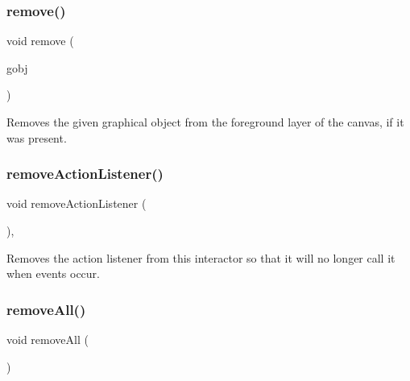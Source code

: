 \subsubsection{\texorpdfstring{remove()}{remove()}\hspace{0.1cm}{\footnotesize\ttfamily [2/2]}}
{\footnotesize\ttfamily void remove (\begin{DoxyParamCaption}\item[{\mbox{\hyperlink{classsgl_1_1GObject}{G\+Object}} \&}]{gobj }\end{DoxyParamCaption})\hspace{0.3cm}{\ttfamily [virtual]}}



Removes the given graphical object from the foreground layer of the canvas, if it was present. 

\mbox{\label{classsgl_1_1GInteractor_ab7fe7a876367b87cf7202f947f1d05e4}} 
\subsubsection{\texorpdfstring{remove\+Action\+Listener()}{removeActionListener()}}
{\footnotesize\ttfamily void remove\+Action\+Listener (\begin{DoxyParamCaption}{ }\end{DoxyParamCaption})\hspace{0.3cm}{\ttfamily [virtual]}, {\ttfamily [inherited]}}



Removes the action listener from this interactor so that it will no longer call it when events occur. 

\mbox{\label{classsgl_1_1GCanvas_a9b0a5a3ad9972ab0e8eb0b54873aac6b}} 
\subsubsection{\texorpdfstring{remove\+All()}{removeAll()}}
{\footnotesize\ttfamily void remove\+All (\begin{DoxyParamCaption}{ }\end{DoxyParamCaption})\hspace{0.3cm}{\ttfamily [virtual]}}



